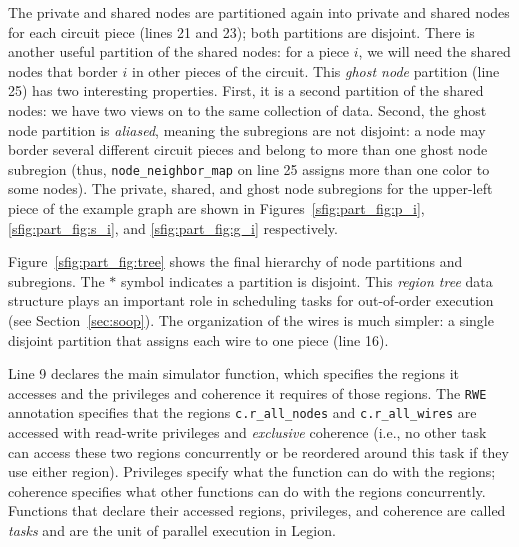 The private and shared nodes are partitioned again into private and shared nodes for each circuit piece (lines 21
and 23);  both partitions are disjoint.  There is another useful partition of the shared nodes:
for a piece $i$, we will need the shared nodes that border $i$ in other pieces of the circuit.
This {\em ghost node} partition (line 25) has two interesting properties.  First, it is a second partition of the shared nodes:
we have two views on to the same collection of data.  Second, the ghost node partition is {\em aliased}, meaning the subregions
are not disjoint: a node may border several different circuit pieces and belong to more than one ghost node subregion (thus, {\tt node\_neighbor\_map} on line 25 assigns more than one color to some nodes).
The private, shared, and ghost node subregions
for the upper-left piece of the example graph are shown in
Figures~\ref{sfig:part_fig:p_i}, \ref{sfig:part_fig:s_i}, and
\ref{sfig:part_fig:g_i} respectively.  

Figure~\ref{sfig:part_fig:tree} shows the final hierarchy of node
partitions and subregions. The $*$ symbol indicates a partition is disjoint. This
{\em region tree} data structure plays an important role in scheduling
tasks for out-of-order execution (see Section~\ref{sec:soop}).
The organization of the wires is much simpler: a single disjoint partition
that assigns each wire to one piece (line 16).

%
%
Line 9 declares the main simulator function, which specifies the regions it 
accesses and the privileges and coherence it requires of those regions.
The {\tt RWE} annotation specifies that
the regions {\tt c.r\_all\_nodes} and {\tt c.r\_all\_wires}
are accessed with read-write privileges and {\em exclusive} coherence (i.e., no other
task can access these two regions concurrently or be reordered around this
task if they use either region).  
Privileges specify what
the function can do with the regions; coherence specifies what other
functions can do with the regions concurrently.  Functions that
declare their accessed regions, privileges, and coherence are called {\em tasks}
and are the unit of parallel execution in Legion.

